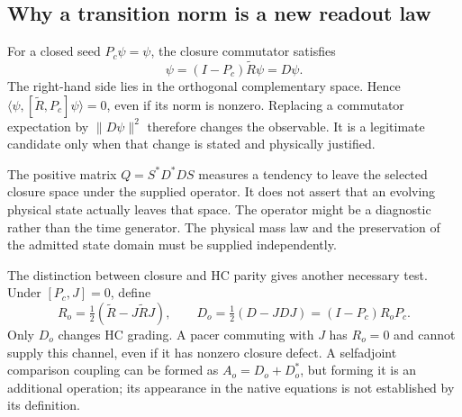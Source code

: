 \subsection{Why a transition norm is a new readout law}
For a closed seed $P_c\psi=\psi$, the closure commutator satisfies
\begin{equation}
 [\widetilde R,P_c]\psi=(I-P_c)\widetilde R\psi=D\psi.
\end{equation}
The right-hand side lies in the orthogonal complementary space. Hence
$\langle\psi,[\widetilde R,P_c]\psi\rangle=0$, even if its
norm is nonzero. Replacing a commutator expectation by
$\|D\psi\|^2$ therefore changes the observable. It is a legitimate
candidate only when that change is stated and physically justified.

The positive matrix $Q=S^*D^*DS$ measures a tendency to leave the
selected closure space under the supplied operator. It does not
assert that an evolving physical state actually leaves that space.
The operator might be a diagnostic rather than the time generator.
The physical mass law and the preservation of the admitted state
domain must be supplied independently.

The distinction between closure and HC parity gives another necessary
test. Under $[P_c,J]=0$, define
\begin{equation}
 R_o=\tfrac12(\widetilde R-J\widetilde RJ),\qquad
 D_o=\tfrac12(D-JDJ)=(I-P_c)R_oP_c.
\end{equation}
Only $D_o$ changes HC grading. A pacer commuting with $J$ has
$R_o=0$ and cannot supply this channel, even if it has nonzero
closure defect. A selfadjoint comparison coupling can be formed as
$A_o=D_o+D_o^*$, but forming it is an additional operation; its
appearance in the native equations is not established by its definition.

